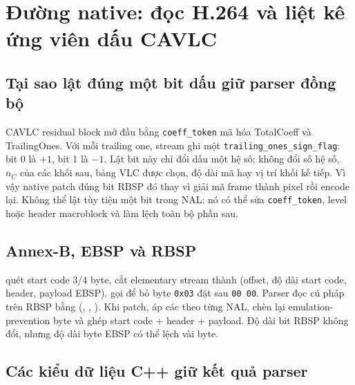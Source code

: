 \documentclass[11pt,a4paper]{article}
\begin{document}
\section{Đường native: đọc H.264 và liệt kê ứng viên dấu CAVLC}

\subsection{Tại sao lật đúng một bit dấu giữ parser đồng bộ}

CAVLC residual block mở đầu bằng \texttt{coeff\_token} mã hóa TotalCoeff và
TrailingOnes. Với mỗi trailing one, stream ghi một
\texttt{trailing\_ones\_sign\_flag}: bit 0 là $+1$, bit 1 là $-1$. Lật bit này chỉ
đổi dấu một hệ số; không đổi số hệ số, $n_C$ của các khối sau, bảng VLC được chọn,
độ dài mã hay vị trí khối kế tiếp. Vì vậy native patch đúng bit RBSP đó thay vì giải
mã frame thành pixel rồi encode lại. Không thể lật tùy tiện một bit trong NAL: nó có
thể sửa \texttt{coeff\_token}, level hoặc header macroblock và làm lệch toàn bộ phần
sau.

\subsection{Annex-B, EBSP và RBSP}

 quét start code 3/4 byte, cắt elementary stream thành
 (offset, độ dài start code, header, payload EBSP).
 gọi  để bỏ byte \texttt{0x03}
đặt sau \texttt{00 00}. Parser đọc cú pháp trên RBSP bằng 
(, , ). Khi patch,
 áp các  theo từng NAL,
 chèn lại emulation-prevention byte và
 ghép start code + header + payload. Độ dài bit RBSP không
đổi, nhưng độ dài byte EBSP có thể lệch vài byte.

\subsection{Các kiểu dữ liệu C++ giữ kết quả parser}
\end{document}
